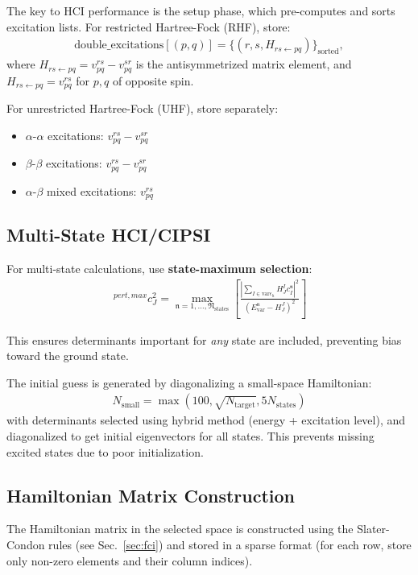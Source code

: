 \documentclass[a4paper,12pt,oneside]{book}
\newcommand{\beq}{\begin{equation}\begin{aligned}}
\newcommand{\eeq}{\end{aligned}\end{equation}}
\newcommand{\sect}[1]{Sec.~\ref{#1}}
\newcommand{\st}[1]{\mathfrak{#1}}
\newcommand{\pre}[1]{\,#1\!}
\begin{document}
The key to HCI performance is the setup phase, which pre-computes and sorts excitation lists.
For restricted Hartree-Fock (RHF), store:
\beq
\text{double\_excitations}[(p,q)] = \{(r,s,H_{rs \leftarrow pq})\}_{\text{sorted}},
\eeq
where $H_{rs \leftarrow pq} = v_{pq}^{rs} - v_{pq}^{sr}$ is the antisymmetrized matrix element,
and $H_{rs \leftarrow pq} = v_{pq}^{rs}$ for $p,q$ of opposite spin.

For unrestricted Hartree-Fock (UHF), store separately:
\begin{itemize}
\item $\alpha$-$\alpha$ excitations: $v_{pq}^{rs} - v_{pq}^{sr}$
\item $\beta$-$\beta$ excitations: $v_{pq}^{rs} - v_{pq}^{sr}$
\item $\alpha$-$\beta$ mixed excitations: $v_{pq}^{rs}$
\end{itemize}

\subsection{Multi-State HCI/CIPSI}

For multi-state calculations, use \textbf{state-maximum selection}:
\beq
\pre{^{pert,max}}c_J^2 = \max_{\st{n}=\st{1},\ldots,\st{N}_{\text{states}}} \left[  
    \frac{\left|\sum_{I \in \text{var}\epsilon_h}H^I_{J} c^\st{n}_{I}\right|^2}{(E^\st{n}_{\text{var}} - H^J_{J})^2} \right]
\eeq

This ensures determinants important for \emph{any} state are included, preventing bias 
toward the ground state.


The initial guess is generated by diagonalizing a small-space Hamiltonian:
\beq
N_{\text{small}} = \max\left(100, \sqrt{N_{\text{target}}}, 5 N_{\text{states}}\right)
\eeq
with determinants selected using hybrid method (energy + excitation level), and diagonalized 
to get initial eigenvectors for all states. 
This prevents missing excited states due to poor initialization.

  \subsection{Hamiltonian Matrix Construction}
The Hamiltonian matrix in the selected space is constructed using the Slater-Condon rules
(see \sect{sec:fci}) and stored in a sparse format 
(for each row, store only non-zero elements and their column indices).
\end{document}
